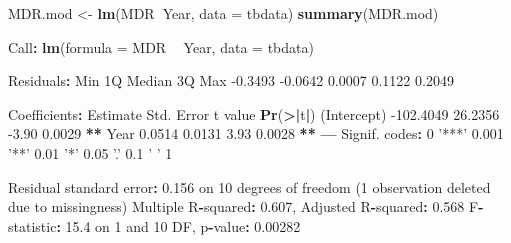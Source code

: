 \documentclass[
]{book}
\newenvironment{Shaded}{\begin{snugshade}}{\end{snugshade}}
\newcommand{\DataTypeTok}[1]{\textcolor[rgb]{0.13,0.29,0.53}{#1}}
\newcommand{\DecValTok}[1]{\textcolor[rgb]{0.00,0.00,0.81}{#1}}
\newcommand{\ErrorTok}[1]{\textcolor[rgb]{0.64,0.00,0.00}{\textbf{#1}}}
\newcommand{\FloatTok}[1]{\textcolor[rgb]{0.00,0.00,0.81}{#1}}
\newcommand{\KeywordTok}[1]{\textcolor[rgb]{0.13,0.29,0.53}{\textbf{#1}}}
\newcommand{\NormalTok}[1]{#1}
\newcommand{\OperatorTok}[1]{\textcolor[rgb]{0.81,0.36,0.00}{\textbf{#1}}}
\newcommand{\StringTok}[1]{\textcolor[rgb]{0.31,0.60,0.02}{#1}}
\begin{document}
\begin{Shaded}
\begin{Highlighting}[]
\NormalTok{MDR.mod <-}\StringTok{ }\KeywordTok{lm}\NormalTok{(MDR}\OperatorTok{~}\NormalTok{Year, }\DataTypeTok{data =}\NormalTok{ tbdata)}
\KeywordTok{summary}\NormalTok{(MDR.mod)}

\NormalTok{Call}\OperatorTok{:}
\KeywordTok{lm}\NormalTok{(}\DataTypeTok{formula =}\NormalTok{ MDR }\OperatorTok{~}\StringTok{ }\NormalTok{Year, }\DataTypeTok{data =}\NormalTok{ tbdata)}

\NormalTok{Residuals}\OperatorTok{:}
\StringTok{    }\NormalTok{Min      1Q  Median      3Q     Max }
\FloatTok{-0.3493} \FloatTok{-0.0642}  \FloatTok{0.0007}  \FloatTok{0.1122}  \FloatTok{0.2049} 

\NormalTok{Coefficients}\OperatorTok{:}
\StringTok{             }\NormalTok{Estimate Std. Error t value }\KeywordTok{Pr}\NormalTok{(}\OperatorTok{>}\ErrorTok{|}\NormalTok{t}\OperatorTok{|}\NormalTok{)   }
\NormalTok{(Intercept) }\FloatTok{-102.4049}    \FloatTok{26.2356}   \FloatTok{-3.90}   \FloatTok{0.0029} \OperatorTok{**}
\NormalTok{Year           }\FloatTok{0.0514}     \FloatTok{0.0131}    \FloatTok{3.93}   \FloatTok{0.0028} \OperatorTok{**}
\OperatorTok{---}
\NormalTok{Signif. codes}\OperatorTok{:}\StringTok{  }\DecValTok{0} \StringTok{'***'} \FloatTok{0.001} \StringTok{'**'} \FloatTok{0.01} \StringTok{'*'} \FloatTok{0.05} \StringTok{'.'} \FloatTok{0.1} \StringTok{' '} \DecValTok{1}

\NormalTok{Residual standard error}\OperatorTok{:}\StringTok{ }\FloatTok{0.156}\NormalTok{ on }\DecValTok{10}\NormalTok{ degrees of freedom}
\NormalTok{  (}\DecValTok{1}\NormalTok{ observation deleted due to missingness)}
\NormalTok{Multiple R}\OperatorTok{-}\NormalTok{squared}\OperatorTok{:}\StringTok{  }\FloatTok{0.607}\NormalTok{, Adjusted R}\OperatorTok{-}\NormalTok{squared}\OperatorTok{:}\StringTok{  }\FloatTok{0.568} 
\NormalTok{F}\OperatorTok{-}\NormalTok{statistic}\OperatorTok{:}\StringTok{ }\FloatTok{15.4}\NormalTok{ on }\DecValTok{1}\NormalTok{ and }\DecValTok{10}\NormalTok{ DF,  p}\OperatorTok{-}\NormalTok{value}\OperatorTok{:}\StringTok{ }\FloatTok{0.00282}
\end{Highlighting}
\end{Shaded}
\end{document}
